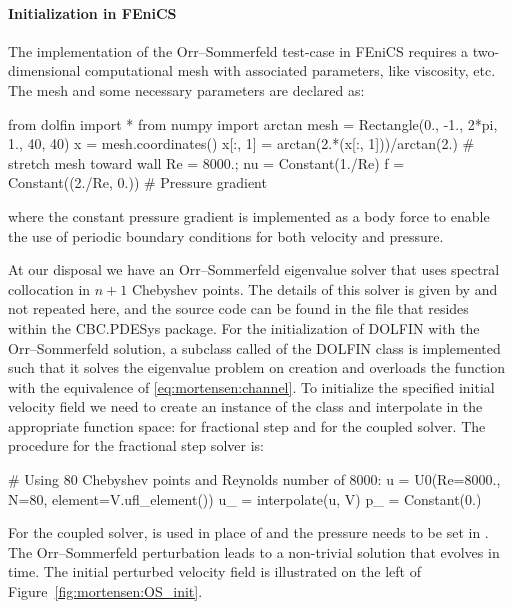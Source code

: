 \paragraph{Initialization in FEniCS}

The implementation of the Orr--Sommerfeld test-case in FEniCS requires
a two-dimensional computational mesh with associated parameters, like
viscosity, etc. The mesh and some necessary parameters are declared as:
\begin{python}
from dolfin import *
from numpy import arctan
mesh = Rectangle(0., -1., 2*pi, 1., 40, 40)
x = mesh.coordinates()
x[:, 1] = arctan(2.*(x[:, 1]))/arctan(2.)  # stretch mesh toward wall
Re = 8000.; nu = Constant(1./Re)
f = Constant((2./Re, 0.)) # Pressure gradient
\end{python}
where the constant pressure gradient is implemented as a body force
to enable the use of periodic boundary conditions for both velocity
and pressure.

At our disposal we have an Orr--Sommerfeld eigenvalue solver that uses
spectral collocation in $n+1$ Chebyshev points. The details of this
solver is given by \citet{Trefethen2006} and not repeated here, and the
source code can be found in the file  that
resides within the CBC.PDESys package. For the initialization of DOLFIN 
with the Orr--Sommerfeld solution, a subclass called  of the
DOLFIN class  is implemented such that it solves the
eigenvalue problem on creation and overloads the  function
with the equivalence of \eqref{eq:mortensen:channel}. To initialize the
specified initial velocity field we need to create an instance of the
 class and interpolate in the appropriate function space:
 for fractional step and  for the coupled solver. The
procedure for the fractional step solver is:
\begin{python}
# Using 80 Chebyshev points and Reynolds number of 8000:
u = U0(Re=8000., N=80, element=V.ufl_element())
u_ = interpolate(u, V)
p_ = Constant(0.)
\end{python}
For the coupled solver,  is used in place of 
and the pressure needs to be set in . The Orr--Sommerfeld
perturbation leads to a non-trivial solution that evolves in
time. The initial perturbed velocity field is illustrated on the left
of Figure~\ref{fig:mortensen:OS_init}.

